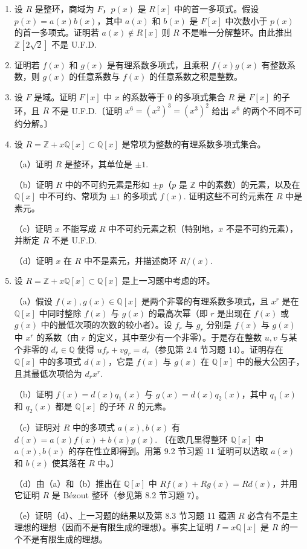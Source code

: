 \begin{enumerate}
\item 设 \(R\) 是整环，商域为 \(F\)，\(p(x)\) 是 \(R[x]\) 中的首一多项式。假设 \(p(x) = a(x)b(x)\)，其中 \(a(x)\) 和 \(b(x)\) 是 \(F[x]\) 中次数小于 \(p(x)\) 的首一多项式。证明若 \(a(x) \notin R[x]\) 则 \(R\) 不是唯一分解整环。由此推出 \(\mathbb{Z}[2\sqrt{2}]\) 不是 U.F.D.

\item 证明若 \(f(x)\) 和 \(g(x)\) 是有理系数多项式，且乘积 \(f(x)g(x)\) 有整数系数，则 \(g(x)\) 的任意系数与 \(f(x)\) 的任意系数之积是整数。

\item 设 \(F\) 是域。证明 \(F[x]\) 中 \(x\) 的系数等于 0 的多项式集合 \(R\) 是 \(F[x]\) 的子环，且 \(R\) 不是 U.F.D.〔证明 \(x^6 = (x^2)^3 = (x^3)^2\) 给出 \(x^6\) 的两个不同不可约分解。〕

\item 设 \(R = \mathbb{Z} + x\mathbb{Q}[x] \subset \mathbb{Q}[x]\) 是常项为整数的有理系数多项式集合。

（a）证明 \(R\) 是整环，其单位是 \(\pm 1\).

（b）证明 \(R\) 中的不可约元素是形如 \(\pm p\)（\(p\) 是 \(\mathbb{Z}\) 中的素数）的元素，以及在 \(\mathbb{Q}[x]\) 中不可约、常项为 \(\pm 1\) 的多项式 \(f(x)\). 证明这些不可约元素在 \(R\) 中是素元。

（c）证明 \(x\) 不能写成 \(R\) 中不可约元素之积（特别地，\(x\) 不是不可约元素），并断定 \(R\) 不是 U.F.D.

（d）证明 \(x\) 在 \(R\) 中不是素元，并描述商环 \(R/(x)\).

\item 设 \(R = \mathbb{Z} + x\mathbb{Q}[x] \subset \mathbb{Q}[x]\) 是上一习题中考虑的环。

（a）假设 \(f(x), g(x) \in \mathbb{Q}[x]\) 是两个非零的有理系数多项式，且 \(x^r\) 是在 \(\mathbb{Q}[x]\) 中同时整除 \(f(x)\) 与 \(g(x)\) 的最高次幂（即 \(r\) 是出现在 \(f(x)\) 或 \(g(x)\) 中的最低次项的次数的较小者）。设 \(f_r\) 与 \(g_r\) 分别是 \(f(x)\) 与 \(g(x)\) 中 \(x^r\) 的系数（由 \(r\) 的定义，其中至少有一个非零）。于是存在整数 \(u, v\) 与某个非零的 \(d_r \in \mathbb{Q}\) 使得 \(uf_r + vg_r = d_r\)（参见第 2.4 节习题 14）。证明存在 \(\mathbb{Q}[x]\) 中的多项式 \(d(x)\)，它是 \(f(x)\) 与 \(g(x)\) 在 \(\mathbb{Q}[x]\) 中的最大公因子，且其最低次项恰为 \(d_rx^r\).

（b）证明 \(f(x) = d(x)q_1(x)\) 与 \(g(x) = d(x)q_2(x)\)，其中 \(q_1(x)\) 和 \(q_2(x)\) 都是 \(\mathbb{Q}[x]\) 的子环 \(R\) 的元素。

（c）证明对 \(R\) 中的多项式 \(a(x), b(x)\) 有 \(d(x) = a(x)f(x) + b(x)g(x)\). 〔在欧几里得整环 \(\mathbb{Q}[x]\) 中 \(a(x), b(x)\) 的存在性立即得到。用第 9.2 节习题 11 证明可以选取 \(a(x)\) 和 \(b(x)\) 使其落在 \(R\) 中。〕

（d）由（a）和（b）推出在 \(\mathbb{Q}[x]\) 中 \(Rf(x) + Rg(x) = Rd(x)\)，并用它证明 \(R\) 是 Bézout 整环（参见第 8.2 节习题 7）。

（e）证明（d）、上一习题的结果以及第 8.3 节习题 11 蕴涵 \(R\) 必含有不是主理想的理想（因而不是有限生成的理想）。事实上证明 \(I = x\mathbb{Q}[x]\) 是 \(R\) 的一个不是有限生成的理想。
\end{enumerate}

